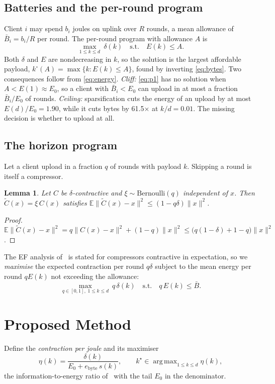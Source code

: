 \documentclass[conference,a4paper]{IEEEtran}
\newtheorem{lemma}{Lemma}
\newcommand{\Ez}{E_0}
\newcommand{\kst}{k^\star}
\newcommand{\ko}{k^{\circ}}
\newcommand{\Bbar}{\bar{B}}
\DeclareMathOperator*{\argmax}{arg\,max}
\begin{document}
\subsection{Batteries and the per-round program}
Client $i$ may spend $b_i$ joules on uplink over $R$ rounds, a mean allowance of $\Bbar_i=b_i/R$ per round. The per-round program with allowance $A$ is
\begin{equation}
\max_{1\le k\le d}\ \delta(k)\quad\text{s.t.}\quad E(k)\le A .
\label{eq:p1}
\end{equation}
Both $\delta$ and $E$ are nondecreasing in $k$, so the solution is the largest affordable payload, $\ko(A)=\max\{k:E(k)\le A\}$, found by inverting \eqref{eq:bytes}. Two consequences follow from \eqref{eq:energy}. \emph{Cliff:} \eqref{eq:p1} has no solution when $A<E(1)\approx\Ez$, so a client with $\Bbar_i<\Ez$ can upload in at most a fraction $\Bbar_i/\Ez$ of rounds. \emph{Ceiling:} sparsification cuts the energy of an upload by at most $E(d)/\Ez=1.90$, while it cuts bytes by 61.5$\times$ at $k/d=0.01$. The missing decision is whether to upload at all.

\subsection{The horizon program}
Let a client upload in a fraction $q$ of rounds with payload $k$. Skipping a round is itself a compressor.

\begin{lemma}
\label{lem:comp}
Let $C$ be $\delta$-contractive and $\xi\sim\mathrm{Bernoulli}(q)$ independent of $x$. Then $\tilde{C}(x)=\xi\,C(x)$ satisfies $\mathbb{E}\|\tilde{C}(x)-x\|^2\le(1-q\delta)\|x\|^2$.
\end{lemma}
\begin{proof}
$\mathbb{E}\|\tilde{C}(x)-x\|^2=q\|C(x)-x\|^2+(1-q)\|x\|^2\le\bigl(q(1-\delta)+1-q\bigr)\|x\|^2$.
\end{proof}

The EF analysis of~\cite{stich2020} is stated for compressors contractive in expectation, so we \emph{maximise} the expected contraction per round $q\delta$ subject to the mean energy per round $qE(k)$ not exceeding the allowance:
\begin{equation}
\max_{q\in[0,1],\;1\le k\le d}\ q\,\delta(k)\quad\text{s.t.}\quad q\,E(k)\le\Bbar .
\label{eq:p2}
\end{equation}

\section{Proposed Method}
\label{sec:method}
Define the \emph{contraction per joule} and its maximiser
\begin{equation}
\eta(k)=\frac{\delta(k)}{\Ez+e_{\text{byte}}\,s(k)},\qquad \kst\in\argmax_{1\le k\le d}\eta(k),
\label{eq:eta}
\end{equation}
the information-to-energy ratio of~\cite{vaishnav2023} with the tail $\Ez$ in the denominator.
\end{document}
